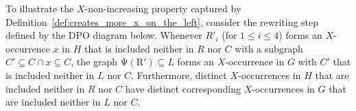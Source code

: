 \begin{example}
    To illustrate the $X$-non-increasing property captured by Definition~\ref{def:creates_more_x_on_the_left},
    consider the rewriting step defined by the DPO diagram below. Whenever \( R'_i \) (for \( 1 \leq i \leq 4 \)) forms an \( X \)-occurrence $x$ in $H$ that is included neither in \( R \) nor $C$ with a subgraph $C' \subseteq C \cap x \subseteq C$, the graph
    \( \operatorname{\Psi(R')} \subseteq L\) forms an \( X \)-occurrence in $G$ with $C'$ that is included neither in \( L \) nor $C$.
    Furthermore, distinct $X$-occurrences in $H$ that are included neither in \( R \) nor $C$ have distinct corresponding $X$-occurrences in $G$ that are included neither in \( L \) nor $C$.

\end{example}

